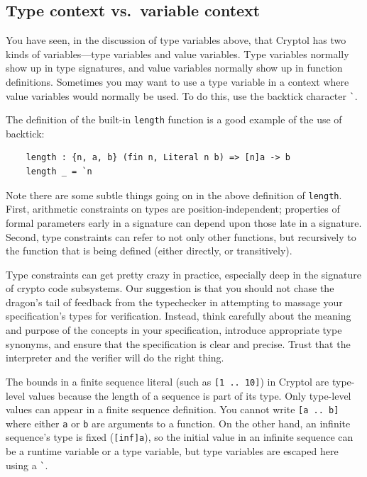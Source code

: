 \subsection{Type context vs.\ variable context}\indTypeContext
\label{sec:type-context-vs}

You have seen, in the discussion of type variables above, that Cryptol
has two kinds of variables---type variables and value variables. Type
variables normally show up in type signatures, and value variables
normally show up in function definitions. Sometimes you may want to
use a type variable in a context where value variables would normally
be used.  To do this, use the backtick character {\tt \Verb|`|}.

The definition of the built-in \texttt{length} function is a good example
of the use of backtick:
\begin{Verbatim}
    length : {n, a, b} (fin n, Literal n b) => [n]a -> b
    length _ = `n
\end{Verbatim}

\begin{tip}
  Note there are some subtle things going on in the above definition
  of \texttt{length}.  First, arithmetic constraints on types are
  position-independent; properties of formal parameters early in a
  signature can depend upon those late in a signature.  Second, type
  constraints can refer to not only other functions, but recursively
  to the function that is being defined (either directly, or
  transitively).

  Type constraints can get pretty crazy in practice, especially deep
  in the signature of crypto code subsystems.  Our suggestion is that
  you should not chase the dragon's tail of feedback from the
  typechecker in attempting to massage your specification's types for
  verification.  Instead, think carefully about the meaning and
  purpose of the concepts in your specification, introduce appropriate
  type synonyms, and ensure that the specification is clear and
  precise.  Trust that the interpreter and the verifier will do the
  right thing.
\end{tip}

The bounds in a finite sequence literal (such as \texttt{[1 ..\ 10]}) in
Cryptol are type-level values because the length of a sequence is part
of its type.  Only type-level values can appear in a finite sequence
definition.  You cannot write \texttt{[a ..\ b]} where either \texttt{a} or
\texttt{b} are arguments to a function.  On the other hand, an infinite
sequence's type is fixed (\texttt{[inf]a}), so the initial value in an
infinite sequence can be a runtime variable or a type variable, but
type variables are escaped here using a {\tt \Verb|`|}.

